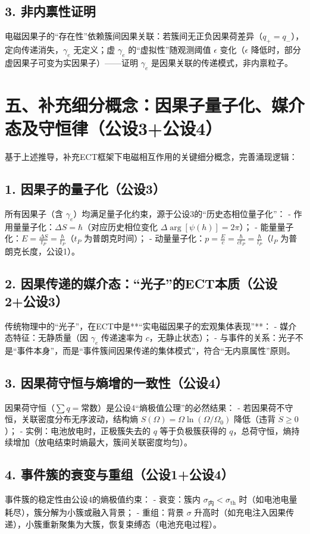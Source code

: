 \documentclass{article}
\begin{document}
\subsection*{3. 非内禀性证明}
电磁因果子的“存在性”依赖簇间因果关联：若簇间无正负因果荷差异（$q_+ = q_-$），定向传递消失，$\gamma_e$ 无定义；虚 $\gamma_e$ 的“虚拟性”随观测阈值 $\epsilon$ 变化（$\epsilon$ 降低时，部分虚因果子可变为实因果子）——证明 $\gamma_e$ 是因果关联的传递模式，非内禀粒子。


\section*{五、补充细分概念：因果子量子化、媒介态及守恒律（公设3+公设4）}
基于上述推导，补充ECT框架下电磁相互作用的关键细分概念，完善涌现逻辑：

\subsection*{1. 因果子的量子化（公设3）}
所有因果子（含 $\gamma_e$）均满足量子化约束，源于公设3的“历史态相位量子化”：
- 作用量量子化：$\Delta S = \hbar$（对应历史相位变化 $\Delta \arg[\psi(h)] = 2\pi$）；  
- 能量量子化：$E = \frac{\Delta S}{t_P} = \frac{\hbar}{t_P}$（$t_P$ 为普朗克时间）；  
- 动量量子化：$p = \frac{E}{c} = \frac{\hbar}{c t_P} = \frac{\hbar}{l_P}$（$l_P$ 为普朗克长度，公设1）。

\subsection*{2. 因果传递的媒介态：“光子”的ECT本质（公设2+公设3）}
传统物理中的“光子”，在ECT中是**“实电磁因果子的宏观集体表现”**：
- 媒介态特征：无静质量（因 $\gamma_e$ 传递速率为 $c$，无静止状态）；  
- 与事件的关系：光子不是“事件本身”，而是“事件簇间因果传递的集体模式”，符合“无内禀属性”原则。

\subsection*{3. 因果荷守恒与熵增的一致性（公设4）}
因果荷守恒（$\sum q = \text{常数}$）是公设4“熵极值公理”的必然结果：
- 若因果荷不守恒，关联密度分布无序波动，结构熵 $S(\Omega) = \Omega \ln(\Omega/\Omega_0)$ 降低（违背 $\dot{S} \geq 0$）；  
- 实例：电池放电时，正极簇失去的 $q$ 等于负极簇获得的 $q$，总荷守恒，熵持续增加（放电结束时熵最大，簇间关联密度均匀）。

\subsection*{4. 事件簇的衰变与重组（公设1+公设4）}
事件簇的稳定性由公设4的熵极值约束：
- 衰变：簇内 $\sigma_{\text{内}} < \sigma_{\text{th}}$ 时（如电池电量耗尽），簇分解为小簇或融入背景；  
- 重组：背景 $\sigma$ 升高时（如充电注入因果传递），小簇重新聚集为大簇，恢复束缚态（电池充电过程）。
\end{document}
